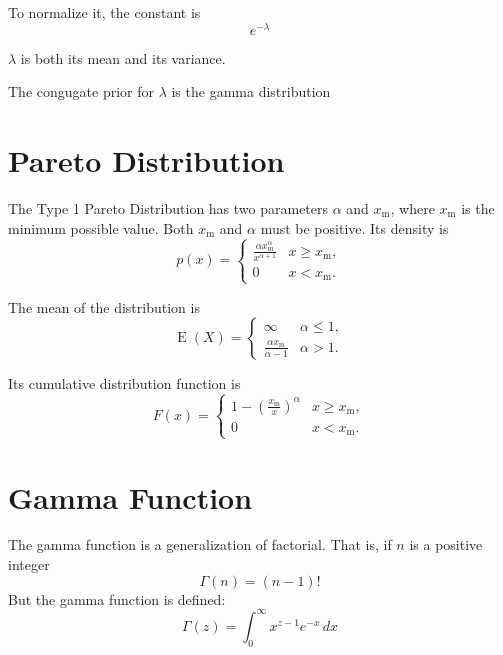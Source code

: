 \documentclass[12pt]{article}
\begin{document}
To normalize it, the constant is
\begin{equation*}
e^{-\lambda}
\end{equation*}

$\lambda$ is both its mean and its variance.

The congugate prior for $\lambda$ is the gamma distribution

\section*{Pareto Distribution}

The Type 1 Pareto Distribution has two parameters $\alpha$ and $x_\mathrm{m}$, where $x_\mathrm{m}$ is the minimum possible value.  Both  $x_\mathrm{m}$ and $\alpha$ must be positive. Its density is
\begin{equation*}
p(x)= \begin{cases} \frac{\alpha x_\mathrm{m}^\alpha}{x^{\alpha+1}} & x \ge x_\mathrm{m}, \\ 0 & x < x_\mathrm{m}. \end{cases}
\end{equation*}

The mean of the distribution is
\begin{equation*}
\operatorname{E}(X)= \begin{cases} \infty & \alpha\le 1, \\
\frac{\alpha x_\mathrm{m}}{\alpha-1} & \alpha>1.
\end{cases}
\end{equation*}

Its cumulative distribution function is
\begin{equation*}
F(x) = \begin{cases}
1-\left(\frac{x_\mathrm{m}}{x}\right)^\alpha & x \ge x_\mathrm{m}, \\
0 & x < x_\mathrm{m}.\end{cases}
\end{equation*}

\section*{Gamma Function}

The gamma function is a generalization of factorial. That is, if $n$ is a positive integer
\begin{equation*}
\Gamma(n) = (n-1)!
\end{equation*}
But the gamma function is defined:
\begin{equation*}
\Gamma(z) = \int_0^\infty x^{z-1} e^{-x}\,dx
\end{equation*}
\end{document}
